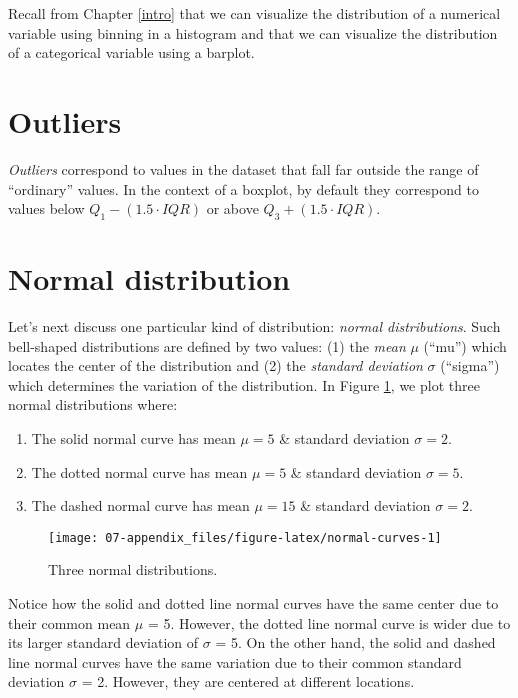 \documentclass[
  12pt,
  a4paper,
  oneside]{book}
\providecommand{\tightlist}{%
  \setlength{\itemsep}{0pt}\setlength{\parskip}{0pt}}
\begin{document}
Recall from Chapter \ref{intro} that we can visualize the distribution of a numerical variable using binning in a histogram and that we can visualize the distribution of a categorical variable using a barplot.

\hypertarget{outliers}{%
\section{Outliers}\label{outliers}}

\emph{Outliers} correspond to values in the dataset that fall far outside the range of ``ordinary'' values. In the context of a boxplot, by default they correspond to values below \(Q_1 - (1.5 \cdot IQR)\) or above \(Q_3 + (1.5 \cdot IQR)\).

\hypertarget{appendix-normal-curve}{%
\section{Normal distribution}\label{appendix-normal-curve}}

Let's next discuss one particular kind of distribution:  \emph{normal distributions}. Such bell-shaped distributions are defined by two values: (1) the \emph{mean} \(\mu\) (``mu'') which locates the center of the distribution and (2) the \emph{standard deviation} \(\sigma\) (``sigma'') which determines the variation of the distribution. In Figure \ref{fig:normal-curves}, we plot three normal distributions where:

\begin{enumerate}
\def\labelenumi{\arabic{enumi}.}
\tightlist
\item
  The solid normal curve has mean \(\mu = 5\) \& standard deviation \(\sigma = 2\).
\item
  The dotted normal curve has mean \(\mu = 5\) \& standard deviation \(\sigma = 5\).
\item
  The dashed normal curve has mean \(\mu = 15\) \& standard deviation \(\sigma = 2\).
\end{enumerate}

\begin{figure}
\texttt{[image: 07-appendix\_files/figure-latex/normal-curves-1]} \caption{Three normal distributions.}\label{fig:normal-curves}
\end{figure}

Notice how the solid and dotted line normal curves have the same center due to their common mean \(\mu\) = 5. However, the dotted line normal curve is wider due to its larger standard deviation of \(\sigma\) = 5. On the other hand, the solid and dashed line normal curves have the same variation due to their common standard deviation \(\sigma\) = 2. However, they are centered at different locations.
\end{document}
